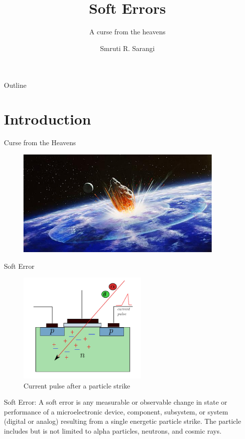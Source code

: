 \documentclass{beamer}
\title %
{Soft Errors}
\subtitle
{A curse from the heavens} %
\author %
{Smruti R. Sarangi}
\institute[Universities of Somewhere and Elsewhere] %
{
  Department of Computer Science\\
  Indian Institute of Technology \\
  New Delhi, India 
}
\date{}
\begin{document}
\begin{frame}
  \titlepage
\end{frame}

\begin{frame}{Outline}
  \tableofcontents
\end{frame}

\section{Introduction}

\begin{frame}{Curse from the Heavens}
 \begin{figure}[h]
  \includegraphics[width=4in]{meteorite}
 \end{figure}

\end{frame}

\begin{frame}[shrink=25]{Soft Error}
\begin{figure}[h]
 \includegraphics[width=2.5in]{seu}
  \caption{\footnotesize Current pulse after a particle strike}
\end{figure}
	
\begin{definition}{Soft Error:}
  A {\color{red} soft error} is any measurable or observable change in state or performance of a microelectronic 
    device, component, subsystem, or system (digital or analog) resulting from 
    a single energetic particle strike. The particle includes but is not limited to alpha particles,
    neutrons, and cosmic rays.
\end{definition}

\end{frame}
\end{document}
